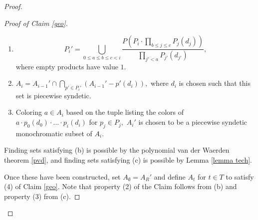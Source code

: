 \documentclass[10pt,a4paper]{article}
\theoremstyle{definition}
\begin{document}
\begin{proof}
\begin{proof}[Proof of Claim \ref{geo}]
\begin{enumerate}
    \item[(a)] $$P_i'= \bigcup_{0\leq a\leq b\leq c<i} \frac{P(P_i\cdot\prod_{b\leq j\leq c} P_j(d_j))}{\prod_{ j' <a}P_{j'}(d_{j'})},$$ where empty products have value $1.$
    \item[(b)] $A_i=A_{i-1}'\cap\bigcap_{p'\in P_i'} (A_{i-1}'-p'(d_i)),$ where $d_i$ is chosen such that this set is piecewise syndetic.
    \item[(c)] Coloring $a\in A_i$ based on the tuple listing the colors of $a\cdot p_0(d_0)\cdot...\cdot p_i(d_i)$ for $p_j\in P_j,$ $A_i'$ is chosen to be a piecewise syndetic monochromatic subset of $A_i.$ 
\end{enumerate}

Finding sets satisfying (b) is possible by the polynomial van der Waerden theorem \ref{pvd}, and finding sets satisfying (c) is possible by Lemma \ref{lemma tech}.

Once these have been constructed, set $A_\emptyset=A_{R}'$ and define $A_t$ for $t\in T$ to satisfy (4) of Claim \ref{geo}.  Note that property (2) of the Claim follows from (b) and property (3) from (c).

\end{proof}

\end{proof}
\end{document}
